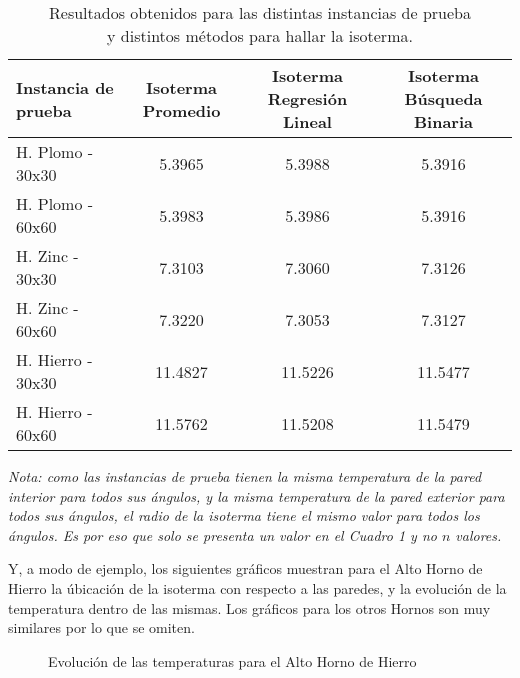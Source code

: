 \begin{table}[H]
    \begin{center}
        \begin{tabular}{| l | c | c | c |}
            \hline
            Instancia de prueba & Isoterma Promedio & Isoterma Regresión Lineal & Isoterma Búsqueda Binaria \\ \hline
            H. Plomo - 30x30    & 5.3965            & 5.3988                    & 5.3916                    \\
            H. Plomo - 60x60    & 5.3983            & 5.3986                    & 5.3916                    \\
            H. Zinc - 30x30     & 7.3103            & 7.3060                    & 7.3126                    \\
            H. Zinc - 60x60     & 7.3220            & 7.3053                    & 7.3127                    \\
            H. Hierro - 30x30   & 11.4827           & 11.5226                   & 11.5477                   \\
            H. Hierro - 60x60   & 11.5762           & 11.5208                   & 11.5479                   \\
            \hline
        \end{tabular}
        \captionsetup{justification=centering}
        \caption{Resultados obtenidos para las distintas instancias de prueba\\ y distintos métodos para hallar la isoterma.}
    \end{center}
\end{table}
\textit{Nota: como las instancias de prueba tienen la misma temperatura de la pared interior para todos sus ángulos, y la misma temperatura de la pared exterior para todos sus ángulos, el radio de la isoterma tiene el mismo valor para todos los ángulos. Es por eso que solo se presenta un valor en el Cuadro 1 y no $n$ valores.}

\medskip

Y, a modo de ejemplo, los siguientes gráficos muestran para el Alto Horno de Hierro la úbicación de la isoterma con respecto a las paredes, y la evolución de la temperatura dentro de las mismas. Los gráficos para los otros Hornos son muy similares por lo que se omiten.

\begin{figure}[H]
    \begin{center}
        \caption{Evolución de las temperaturas para el Alto Horno de Hierro}
        \label{fig:solucion_hierro_1}
    \end{center}
\end{figure}

